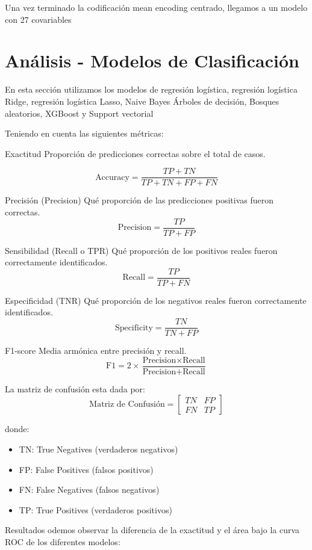 \documentclass{article}
\begin{document}
	
	Una vez terminado la codificación mean encoding centrado, llegamos a un modelo con 27 covariables
	
	
	\section{Análisis - Modelos de Clasificación}
	
	En esta sección utilizamos los modelos de regresión logística, regresión logística Ridge, regresión logística Lasso, Naive Bayes Árboles de decisión, Bosques aleatorios, XGBoost y Support vectorial 
	
	Teniendo en cuenta las siguientes métricas:
	
	Exactitud
	Proporción de predicciones correctas sobre el total de casos.
	
	$$
	\text{Accuracy} = \frac{TP + TN}{TP + TN + FP + FN}
	$$
	
	Precisión (Precision)
	Qué proporción de las predicciones positivas fueron correctas.
	$$
	\text{Precision} = \frac{TP}{TP + FP}
	$$
	
	Sensibilidad (Recall o TPR)
	Qué proporción de los positivos reales fueron correctamente identificados.
	$$
	\text{Recall} = \frac{TP}{TP + FN}
	$$
	
	Especificidad (TNR)
	Qué proporción de los negativos reales fueron correctamente identificados.
	$$
	\text{Specificity} = \frac{TN}{TN + FP}
	$$
	
	F1-score
	Media armónica entre precisión y recall.
	$$
	\text{F1} = 2 \times \frac{\text{Precision} \times \text{Recall}}{\text{Precision} + \text{Recall}}
	$$
	
	La matriz de confusión esta dada por:
	\[\text{Matriz de Confusión}=
	\begin{bmatrix}
		TN & FP \\
		FN & TP
	\end{bmatrix}
	\]
	
	donde:
	\begin{itemize}
		\item TN: True Negatives (verdaderos negativos)
		\item FP: False Positives (falsos positivos)
		\item FN: False Negatives (falsos negativos)
		\item TP: True Positives (verdaderos positivos)
	\end{itemize}
	
	Resultados
	odemos observar la diferencia de la exactitud y el área bajo la curva ROC de los diferentes modelos:
	
\end{document}
